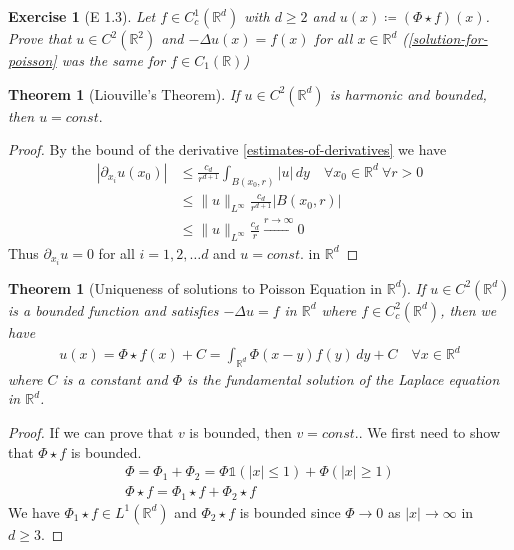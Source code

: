 \documentclass{report}
\theoremstyle{tommy}
\newtheorem{thm}[defn]{Theorem}
\newtheorem{ex}[defn]{Exercise}
\begin{document}
  \begin{ex}[E 1.3]
    Let \(f \in C_c^1(\mathbb{R}^d)\) with \(d \ge 2\) and \(u(x) \coloneqq (\Phi \star f)(x)\). Prove that \(u \in C^2(\mathbb{R}^2)\) and \(- \Delta u(x) = f(x)\) for all \(x \in \mathbb{R}^d\) (\ref{solution-for-poisson} was the same for \(f \in C_1(\mathbb{R})\))
  \end{ex}

  \begin{thm}[Liouville's Theorem] 
    If \(u \in C^2(\mathbb{R}^d)\) is harmonic and bounded, then \(u = const.\)
  \end{thm}

  \begin{proof}
    By the bound of the derivative \ref{estimates-of-derivatives} we have
    \begin{align*}
      |\partial_{x_i} u(x_0)| 
      &\le \frac{c_d}{r^{d+1}} \int_{B(x_0, r)} |u| \, dy \quad \forall x_0 \in \mathbb{R}^d\ \forall r > 0 \\
      &\le \|u\|_{L^\infty} \frac{c_d}{r^{d+1}} |B(x_0, r)| \\
      &\le \|u\|_{L^\infty} \frac{c_d}{r} \xrightarrow{r \to \infty} 0
    \end{align*}
    Thus \(\partial_{x_i} u = 0\) for all \(i = 1, 2, \dots d\) and \(u = const.\) in \(\mathbb{R}^d\)
  \end{proof}

  \begin{thm}[Uniqueness of solutions to Poisson Equation in \(\mathbb{R}^d\)]
    If \(u \in C^2(\mathbb{R}^d)\) is a bounded function and satisfies \(- \Delta u = f\) in \(\mathbb{R}^d\) where \(f \in C_c^2(\mathbb{R}^d)\), then we have
    \begin{align*}
      u(x) = \Phi \star f(x) + C = \int_{\mathbb{R}^d} \Phi(x-y)f(y) \, dy + C \quad \forall x \in \mathbb{R}^d
    \end{align*}
    where \(C\) is a constant and \(\Phi\) is the fundamental solution of the Laplace equation in \(\mathbb{R}^d\).
  \end{thm}

  \begin{proof}
    If we can prove that \(v\) is bounded, then \(v = const.\). We first need to show that \(\Phi \star f\) is bounded.
    \begin{align*}
      \Phi = \Phi_1 + \Phi_2 = \Phi \mathbb{1}(|x| \le 1) + \Phi(|x| \ge 1) \\
      \Phi \star f = \Phi_1 \star f + \Phi_2 \star f
    \end{align*}
    We have \(\Phi_1 \star f \in L^1(\mathbb{R}^d)\) and \(\Phi_2 \star f\) is bounded since \(\Phi \to 0\)  as \(|x| \to \infty\)  in \(d \ge 3\).
  \end{proof}
\end{document}
